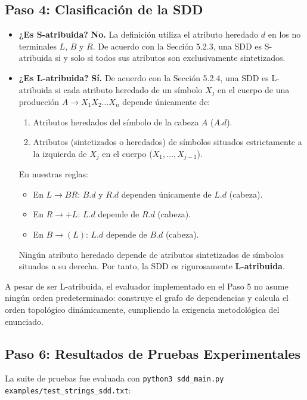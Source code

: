 \documentclass[11pt,a4paper]{article}
\begin{document}
\subsection{Paso 4: Clasificación de la SDD}

\begin{itemize}
    \item \textbf{¿Es S-atribuida?} \textbf{No.} La definición utiliza el atributo heredado $d$ en los no terminales $L$, $B$ y $R$. De acuerdo con la Sección 5.2.3, una SDD es S-atribuida si y solo si todos sus atributos son exclusivamente sintetizados.
    \item \textbf{¿Es L-atribuida?} \textbf{Sí.} De acuerdo con la Sección 5.2.4, una SDD es L-atribuida si cada atributo heredado de un símbolo $X_j$ en el cuerpo de una producción $A \rightarrow X_1 X_2 \dots X_n$ depende únicamente de:
    \begin{enumerate}
        \item Atributos heredados del símbolo de la cabeza $A$ ($A.d$).
        \item Atributos (sintetizados o heredados) de símbolos situados estrictamente a la izquierda de $X_j$ en el cuerpo ($X_1, \dots, X_{j-1}$).
    \end{enumerate}
    En nuestras reglas:
    \begin{itemize}
        \item En $L \rightarrow BR$: $B.d$ y $R.d$ dependen únicamente de $L.d$ (cabeza).
        \item En $R \rightarrow +L$: $L.d$ depende de $R.d$ (cabeza).
        \item En $B \rightarrow (L)$: $L.d$ depende de $B.d$ (cabeza).
    \end{itemize}
    Ningún atributo heredado depende de atributos sintetizados de símbolos situados a su derecha. Por tanto, la SDD es rigurosamente \textbf{L-atribuida}.
\end{itemize}

A pesar de ser L-atribuida, el evaluador implementado en el Paso 5 no asume ningún orden predeterminado: construye el grafo de dependencias y calcula el orden topológico dinámicamente, cumpliendo la exigencia metodológica del enunciado.

\subsection{Paso 6: Resultados de Pruebas Experimentales}

La suite de pruebas fue evaluada con \texttt{python3 sdd\_main.py examples/test\_strings\_sdd.txt}:
\end{document}
